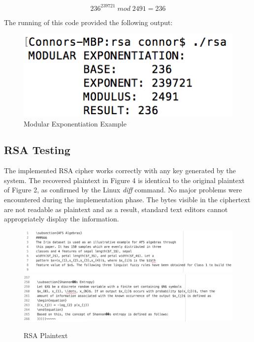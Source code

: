 \documentclass[]{article}
\begin{document}
$$236^{239721}\;mod\;2491=236$$

\vspace{0.2cm}
\noindent
The running of this code provided the following output:

\begin{figure}[H]
		\centering
	\includegraphics[height=\textheight/10,width=\textwidth/3]{exponentiation.png}
	\caption{Modular Exponentiation Example}
\end{figure}

\pagebreak

\vspace*{-0.8cm}

\subsection*{RSA Testing}

The implemented RSA cipher works correctly with any key generated by the system. The recovered plaintext in Figure 4 is identical to the original plaintext of Figure 2, as confirmed by the Linux \textit{diff} command. No major problems were encountered during the implementation phase. The bytes visible in the ciphertext are not readable as plaintext and as a result, standard text editors cannot appropriately display the information.

\vspace{0.5cm}
\begin{figure}[H]
	\includegraphics[height=\textheight/6,width=\textwidth]{rsa_plain1.png}
	\includegraphics[height=\textheight/6,width=\textwidth]{rsa_plain2.png}	
	\caption{RSA Plaintext}
	\centering
\end{figure}
\end{document}
